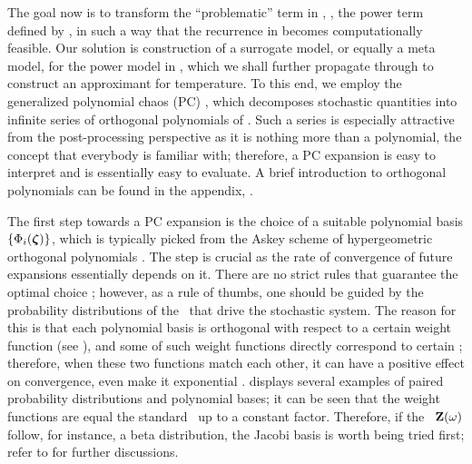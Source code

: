 The goal now is to transform the ``problematic'' term in , \ie, the power term defined by , in such a way that the recurrence in  becomes computationally feasible. Our solution is construction of a surrogate model, or equally a meta model, for the power model in , which we shall further propagate through  to construct an approximant for temperature. To this end, we employ the generalized polynomial chaos (PC) \cite{xiu2002}, which decomposes stochastic quantities into infinite series of orthogonal polynomials of \rvs. Such a series is especially attractive from the post-processing perspective as it is nothing more than a polynomial, the concept that everybody is familiar with; therefore, a PC expansion is easy to interpret and is essentially easy to evaluate. A brief introduction to orthogonal polynomials can be found in the appendix, .


The first step towards a PC expansion is the choice of a suitable polynomial basis $\{ \Phi_i(\boldsymbol{\zeta}) \}$, which is typically picked from the Askey scheme of hypergeometric orthogonal polynomials \cite{xiu2002}. The step is crucial as the rate of convergence of future expansions essentially depends on it. There are no strict rules that guarantee the optimal choice \cite{maitre2010, knio2006}; however, as a rule of thumbs, one should be guided by the probability distributions of the \rvs\ that drive the stochastic system. The reason for this is that each polynomial basis is orthogonal with respect to a certain weight function (see ), and some of such weight functions directly correspond to certain \pdfs; therefore, when these two functions match each other, it can have a positive effect on convergence, even make it exponential \cite{xiu2002}.  displays several examples of paired probability distributions and polynomial bases; it can be seen that the weight functions are equal the standard \pdfs\ up to a constant factor. Therefore, if the \rvs\ $\mathbf{Z}(\omega)$ follow, for instance, a beta distribution, the Jacobi basis is worth being tried first; refer to \cite{xiu2010, xiu2002} for further discussions.

